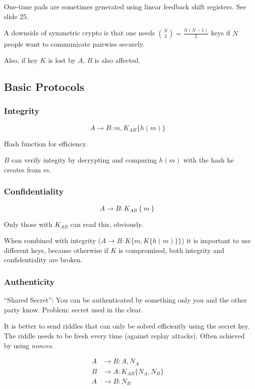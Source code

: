 \documentclass{article}
\begin{document}
One-time pads are sometimes generated using linear feedback shift registers. See
slide 25.

A downside of symmetric crypto is that one needs ${N \choose 2}
= \frac{N(N-1)}{2}$ keys if $N$ people want to communicate pairwise securely.

Also, if key $K$ is lost by $A$, $B$ is also affected.

\subsection{Basic Protocols}

\subsubsection{Integrity}

\[
  A \longrightarrow B : m, K_{AB}\{h(m)\}
\]

Hash function for efficiency.

$B$ can verify integity by decrypting and comparing $h(m)$ with the hash he
creates from $m$.

\subsubsection{Confidentiality}

\[ 
  A \longrightarrow B : K_{AB}\left\{ m \right\}
\]

Only those with $K_{AB}$ can read this, obviously.

When combined with integrity ($A \longrightarrow B : K\{m, K\{h(m)\}\}$) it is
important to use different keys, because otherwise if $K$ is compromised, both integrity
and confidentiality are broken.

\subsubsection{Authenticity}

``Shared Secret'': You can be authenticated by something only you and the other
party know. Problem: secret used in the clear.

It is better to send riddles that can only be solved efficiently using the
secret key. The riddle needs to be fresh every time (against replay attacks).
Often achieved by using \emph{nonces}.

\begin{align*}
  A & \longrightarrow  B  : A, N_A             \\
  B & \longrightarrow  A : K_{AB}\{N_A, N_B\} \\
  A & \longrightarrow  B  : N_B                \\
\end{align*}
\end{document}
